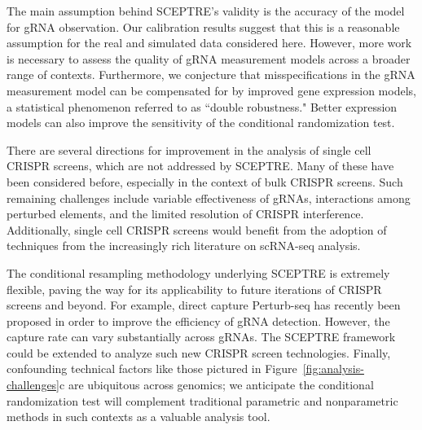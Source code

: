 \documentclass{nature}
\begin{document}
The main assumption behind SCEPTRE's validity is the accuracy of the model for gRNA observation. Our calibration results suggest that this is a reasonable assumption for the real and simulated data considered here. However, more work is necessary to assess the quality of gRNA measurement models across a broader range of contexts. Furthermore, we conjecture that misspecifications in the gRNA measurement model can be compensated for by improved gene expression models, a statistical phenomenon referred to as ``double robustness."\cite{Robins2001,VanderLaan2003} Better expression models can also improve the sensitivity of the conditional randomization test.\cite{Katsevich2020a}

There are several directions for improvement in the analysis of single cell CRISPR screens, which are not addressed by SCEPTRE. Many of these have been considered before, especially in the context of bulk CRISPR screens. Such remaining challenges include variable effectiveness of gRNAs,\cite{Li2015,Daley2018,Xie2019} interactions among perturbed elements,\cite{Xie2017,Zamanighomi2019,Norman2019} and the limited resolution of CRISPR interference.\cite{Hsu2018} Additionally, single cell CRISPR screens would benefit from the adoption of techniques from the increasingly rich literature on scRNA-seq analysis. 

The conditional resampling methodology underlying SCEPTRE is extremely flexible, paving the way for its applicability to future iterations of CRISPR screens and beyond. For example, direct capture Perturb-seq\cite{Replogle2020} has recently been proposed in order to improve the efficiency of gRNA detection. However, the capture rate can vary substantially across gRNAs. The SCEPTRE framework could be extended to analyze such new CRISPR screen technologies. Finally, confounding technical factors like those pictured in Figure~\ref{fig:analysis-challenges}c are ubiquitous across genomics; we anticipate the conditional randomization test will complement traditional parametric and nonparametric methods in such contexts as a valuable analysis tool.

\clearpage

\end{document}
